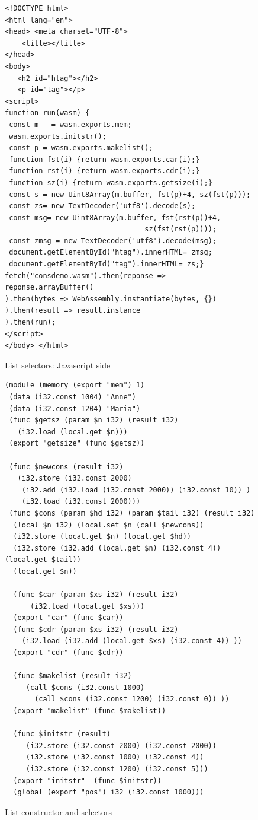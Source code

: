 \documentclass[a4paper,12pt]{book}
\begin{document}
\begin{figure}[!h]
  \begin{verbatim}
<!DOCTYPE html>
<html lang="en">
<head> <meta charset="UTF-8">
    <title></title>
</head>
<body>
   <h2 id="htag"></h2>
   <p id="tag"></p>   
<script>
function run(wasm) {
 const m   = wasm.exports.mem;
 wasm.exports.initstr();
 const p = wasm.exports.makelist();
 function fst(i) {return wasm.exports.car(i);}
 function rst(i) {return wasm.exports.cdr(i);}
 function sz(i) {return wasm.exports.getsize(i);}
 const s = new Uint8Array(m.buffer, fst(p)+4, sz(fst(p)));
 const zs= new TextDecoder('utf8').decode(s);
 const msg= new Uint8Array(m.buffer, fst(rst(p))+4,
                                 sz(fst(rst(p))));
 const zmsg = new TextDecoder('utf8').decode(msg);
 document.getElementById("htag").innerHTML= zmsg;
 document.getElementById("tag").innerHTML= zs;}
fetch("consdemo.wasm").then(reponse => reponse.arrayBuffer()
).then(bytes => WebAssembly.instantiate(bytes, {})
).then(result => result.instance
).then(run);
</script>
</body> </html>
  \end{verbatim}

\caption{List selectors: Javascript side}
  \label{wasm:selectors}
\end{figure}


\begin{figure}[!t]
  \begin{verbatim}
(module (memory (export "mem") 1)
 (data (i32.const 1004) "Anne")
 (data (i32.const 1204) "Maria")
 (func $getsz (param $n i32) (result i32)
   (i32.load (local.get $n)))
 (export "getsize" (func $getsz))
  
 (func $newcons (result i32)
   (i32.store (i32.const 2000)
    (i32.add (i32.load (i32.const 2000)) (i32.const 10)) )
    (i32.load (i32.const 2000))) 
 (func $cons (param $hd i32) (param $tail i32) (result i32)
  (local $n i32) (local.set $n (call $newcons))
  (i32.store (local.get $n) (local.get $hd))
  (i32.store (i32.add (local.get $n) (i32.const 4)) (local.get $tail))
  (local.get $n))

  (func $car (param $xs i32) (result i32)
      (i32.load (local.get $xs)))
  (export "car" (func $car))
  (func $cdr (param $xs i32) (result i32)
    (i32.load (i32.add (local.get $xs) (i32.const 4)) ))
  (export "cdr" (func $cdr))

  (func $makelist (result i32)
     (call $cons (i32.const 1000)
       (call $cons (i32.const 1200) (i32.const 0)) ))
  (export "makelist" (func $makelist))

  (func $initstr (result)
     (i32.store (i32.const 2000) (i32.const 2000))
     (i32.store (i32.const 1000) (i32.const 4))
     (i32.store (i32.const 1200) (i32.const 5)))
  (export "initstr"  (func $initstr))
  (global (export "pos") i32 (i32.const 1000)))
  \end{verbatim}
  \caption{List constructor and selectors}
  \label{wasm:cons}
\end{figure}
\end{document}
